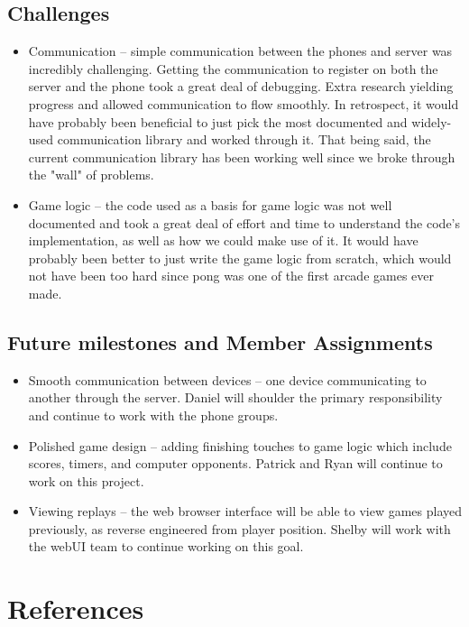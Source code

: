 \documentclass[letterpaper,12pt]{article}
\begin{document}
\subsection{Challenges}
\begin{itemize}
	\item Communication -- simple communication between the phones and server was incredibly challenging. Getting the communication to register on both the server and the phone took a great deal of debugging. Extra research yielding progress and allowed communication to flow smoothly. In retrospect, it would have probably been beneficial to just pick the most documented and widely-used communication library and worked through it. That being said, the current communication library has been working well since we broke through the "wall" of problems.
	\item Game logic -- the code used as a basis for game logic was not well documented and took a great deal of effort and time to understand the code's implementation, as well as how we could make use of it. It would have probably been better to just write the game logic from scratch, which would not have been too hard since pong was one of the first arcade games ever made.
	
\end{itemize}

\subsection{Future milestones and Member Assignments}
\begin{itemize}
	\item Smooth communication between devices -- one device communicating to another through the server. Daniel will shoulder the primary responsibility and continue to work with the phone groups.
	\item Polished game design -- adding finishing touches to game logic which include scores, timers, and computer opponents. Patrick and Ryan will continue to work on this project. 
	\item Viewing replays -- the web browser interface will be able to view games played previously, as reverse engineered from player position. Shelby will work with the webUI team to continue working on this goal.
\end{itemize}


\section{References}
\end{document}
